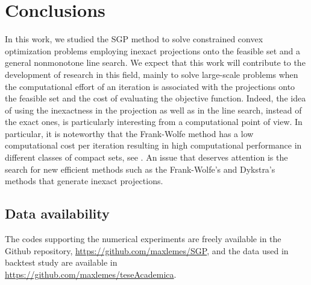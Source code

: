 

\chapter{Conclusions} \label{chap:Conclusions}
\thispagestyle{empty}

In this work, we studied the SGP method  to solve   constrained convex optimization problems employing  inexact projections onto the feasible set and a general nonmonotone  line search. We expect that this work will contribute to the development of research in this field, mainly to solve large-scale problems when the computational effort of an iteration is associated with the projections onto the feasible set and  the cost of evaluating the objective function. Indeed, the idea of using the inexactness in the projection as well as in the line search,   instead of the exact ones, is particularly interesting from a computational point of view. In particular,   it is noteworthy that the Frank-Wolfe method  has a low computational cost per iteration  resulting in high computational performance in different classes of compact sets, see \cite{GarberHazan2015, Jaggi2013}.  An issue that deserves attention is the search for new efficient methods such as the Frank-Wolfe's and Dykstra's  methods that generate inexact projections.


\section*{Data availability} 
The codes supporting the numerical experiments are freely available in the Github repository, \url{https://github.com/maxlemes/SGP}, and the data used in backtest study are available in \\ \url{https://github.com/maxlemes/teseAcademica}.